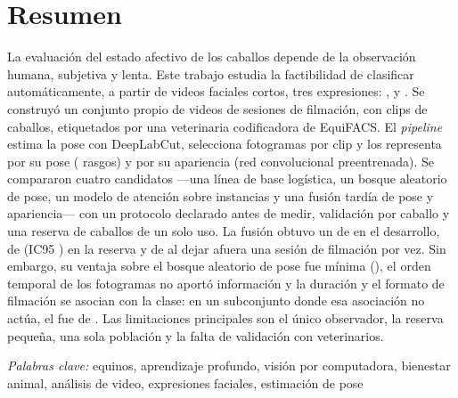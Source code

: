 \chapter*{Resumen}
\noindent La evaluación del estado afectivo de los caballos depende de la observación humana, subjetiva y lenta. Este trabajo estudia la factibilidad de clasificar automáticamente, a partir de videos faciales cortos, tres expresiones: ,  y . Se construyó un conjunto propio de \VideosTotal{} videos de \SesionesTotal{} sesiones de filmación, con \ClipsTotal{} clips de \CaballosTotal{} caballos, etiquetados por una veterinaria codificadora de EquiFACS. El \textit{pipeline} estima la pose con DeepLabCut, selecciona \Fotogramas{} fotogramas por clip y los representa por su pose (\PoseRasgos{} rasgos) y por su apariencia (red convolucional preentrenada). Se compararon cuatro candidatos ---una línea de base logística, un bosque aleatorio de pose, un modelo de atención sobre instancias y una fusión tardía de pose y apariencia--- con un protocolo declarado antes de medir, validación por caballo y una reserva de caballos de un solo uso. La fusión obtuvo un \fmacro{} de \FusionDevF{} en el desarrollo, de \FusionReservaF{} (IC95 \FusionReservaIC{}) en la reserva y de \FusionSesionF{} al dejar afuera una sesión de filmación por vez. Sin embargo, su ventaja sobre el bosque aleatorio de pose fue mínima (\DifFusionRFDev{}), el orden temporal de los fotogramas no aportó información y la duración y el formato de filmación se asocian con la clase: en un subconjunto donde esa asociación no actúa, el \fmacro{} fue de \FusionLimpioF{}. Las limitaciones principales son el único observador, la reserva pequeña, una sola población y la falta de validación con veterinarios.

\medskip
\noindent\hspace{1.27cm}\textit{Palabras clave:} equinos, aprendizaje profundo, visión por computadora, bienestar animal, análisis de video, expresiones faciales, estimación de pose

\clearpage

